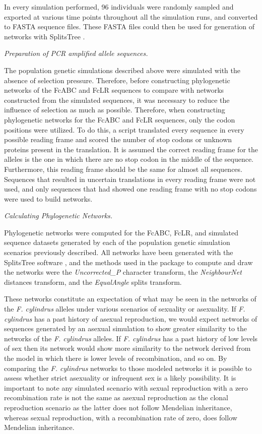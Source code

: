 In every simulation performed, 96 individuals were randomly sampled and exported at various time points throughout all the simulation runs, and converted to FASTA sequence files.
These FASTA files could then be used for generation of networks with SplitsTree \parencite{Huson1998}.

\textit{Preparation of PCR amplified allele sequences.}

The population genetic simulations described above were simulated with the absence of selection pressure.
Therefore, before constructing phylogenetic networks of the FcABC and FcLR sequences to compare with networks constructed from the simulated sequences, it was necessary to reduce the influence of selection as much as possible.
Therefore, when constructing phylogenetic networks for the FcABC and FcLR sequences, only the  codon positions were utilized.
To do this, a script translated every sequence in every possible reading frame and scored the number of stop codons or unknown proteins present in the translation.
It is assumed the correct reading frame for the alleles is the one in which there are no stop codon in the middle of the sequence.
Furthermore, this reading frame should be the same for almost all sequences.
Sequences that resulted in uncertain translations in every reading frame were not used, and only sequences that had showed one reading frame with no stop codons were used to build networks.

\textit{Calculating Phylogenetic Networks.}

Phylogenetic networks were computed for the FcABC, FcLR, and simulated sequence datasets generated by each of the population genetic simulation scenarios previously described.
All networks have been generated with the SplitsTree software \parencite{Huson1998}, and the methods used in the package to compute and draw the networks were the \textit{Uncorrected\_P} character transform, the \textit{NeighbourNet} distances transform, and the \textit{EqualAngle} splits transform.

These networks constitute an expectation of what may be seen in the networks of the \textit{F. cylindrus} alleles under various scenarios of sexuality or asexuality.
If \textit{F. cylindrus} has a past history of asexual reproduction, we would expect networks of sequences generated by an asexual simulation to show greater similarity to the networks of the \textit{F. cylindrus} alleles.
If \textit{F. cylindrus} has a past history of low levels of sex then its network would show more similarity to the network derived from the model in which there is lower levels of recombination, and so on.
By comparing the \textit{F. cylindrus} networks to those modeled networks it is possible to assess whether strict asexuality or infrequent sex is a likely possibility.
It is important to note any simulated scenario with sexual reproduction with a zero recombination rate is not the same as asexual reproduction as the clonal reproduction scenario as the latter does not follow Mendelian inheritance, whereas sexual reproduction, with a recombination rate of zero, does follow Mendelian inheritance.

